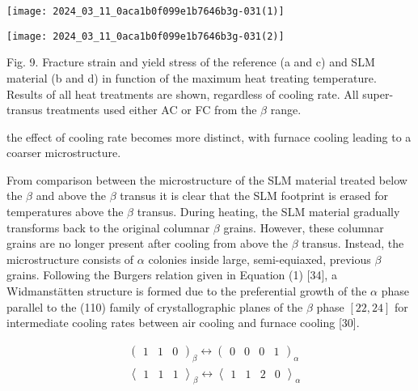 \documentclass[10pt]{article}
\begin{document}
\begin{center}
\texttt{[image: 2024\_03\_11\_0aca1b0f099e1b7646b3g-031(1)]}
\end{center}

\begin{center}
\texttt{[image: 2024\_03\_11\_0aca1b0f099e1b7646b3g-031(2)]}
\end{center}

Fig. 9. Fracture strain and yield stress of the reference (a and c) and SLM material (b and d) in function of the maximum heat treating temperature. Results of all heat treatments are shown, regardless of cooling rate. All super-transus treatments used either AC or FC from the $\beta$ range.

the effect of cooling rate becomes more distinct, with furnace cooling leading to a coarser microstructure.

From comparison between the microstructure of the SLM material treated below the $\beta$ and above the $\beta$ transus it is clear that the SLM footprint is erased for temperatures above the $\beta$ transus. During heating, the SLM material gradually transforms back to the original columnar $\beta$ grains. However, these columnar grains are no longer present after cooling from above the $\beta$ transus. Instead, the microstructure consists of $\alpha$ colonies inside large, semi-equiaxed, previous $\beta$ grains. Following the Burgers relation given in Equation (1) [34], a Widmanstätten structure is formed due to the preferential growth of the $\alpha$ phase parallel to the (110) family of crystallographic planes of the $\beta$ phase $[22,24]$ for intermediate cooling rates between air cooling and furnace cooling [30].


\begin{align*}
& \left(\begin{array}{lll}
1 & 1 & 0
\end{array}\right)_{\beta} \leftrightarrow\left(\begin{array}{llll}
0 & 0 & 0 & 1
\end{array}\right)_{\alpha} \\
& \left\langle\begin{array}{llll}
1 & 1 & 1
\end{array}\right\rangle_{\beta} \leftrightarrow\left\langle\begin{array}{llll}
1 & 1 & 2 & 0
\end{array}\right\rangle_{\alpha} \tag{1}
\end{align*}
\end{document}
